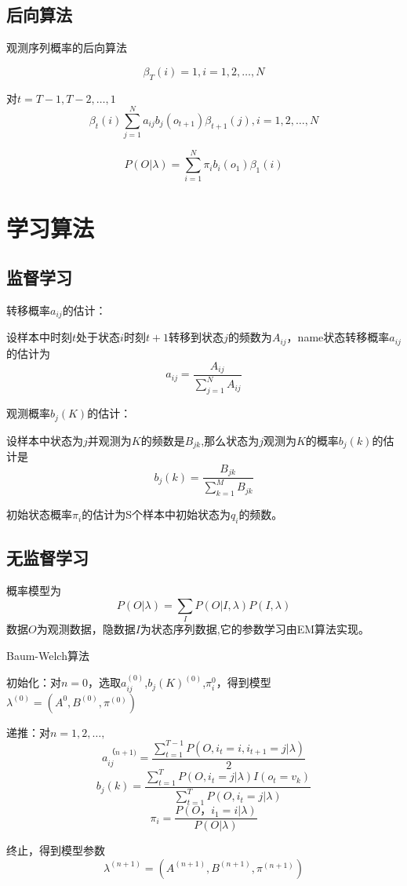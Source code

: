 \documentclass{article}
\begin{document}
	\subsection{后向算法}
	\begin{algorithm}[h]
		\caption{观测序列概率的后向算法}
		\LinesNumbered
		$$\beta _{T}\left ( i \right )=1,i=1,2,\ldots,N$$
		
		对$t=T-1,T-2,\ldots,1$
		$$\beta _{t}\left ( i \right )\sum_{j=1}^{N}a_{ij}b_{j}\left ( o_{t+1} \right )\beta _{t+1}\left ( j \right ),i=1,2,\ldots,N$$
		
		$$P\left ( O|\lambda  \right )=\sum_{i=1}^{N}\pi_{i}b_{i}\left ( o_{1} \right )\beta _{1}\left ( i \right )$$
	\end{algorithm}

	\section{学习算法}
	\subsection{监督学习}
	\noindent 转移概率$a_{ij}$的估计：
	
	设样本中时刻$t$处于状态$i$时刻$t+1$转移到状态$j$的频数为$A_{ij}$，name状态转移概率$a_{ij}$的估计为$$a_{ij}=\frac{A_{ij}}{\sum_{j=1}^{N}A_{ij}}$$
	
	\noindent 观测概率$b_{j}(K)的估计$：
	
	
	设样本中状态为$j$并观测为$K$的频数是$B_{jk}$,那么状态为$j$观测为$K$的概率$b_{j}(k)$的估计是
	$$b_{j}\left ( k \right )=\frac{B_{jk}}{\sum_{k=1}^{M}B_{jk}}$$
	
	初始状态概率$\pi_{i}$的估计为S个样本中初始状态为$q_{i}$的频数。
	
	\subsection{无监督学习}
	概率模型为$$P\left ( O|\lambda  \right )=\sum _{I}P\left ( O|I,\lambda  \right )P\left ( I,\lambda  \right )$$ 数据$O$为观测数据，隐数据$I$为状态序列数据,它的参数学习由EM算法实现。
	
	\begin{algorithm}[h]
		\caption{Baum-Welch算法}
		\LinesNumbered
		初始化：对$n=0$，选取$a_{ij}^{(0)}$,$b_{j}(K)^(0)$,$\pi_{i}^{0}$，得到模型$\lambda ^{(0)}=\left ( A^{0},B^{(0)},\pi^{(0)} \right )$
		
		递推：对$n=1,2,\ldots,$ $$a_{ij}^{（n+1)}=\frac{\sum_{t=1}^{T-1}P\left ( O,i_{t}=i,i_{t+1}=j|\lambda  \right )}{2}$$
		$$b_{j}\left ( k \right )=\frac{\sum_{t=1}^{T}P\left ( O,i_{t}=j|\lambda  \right )I\left ( o_{t}=v_{k} \right )}{\sum_{t=1}^{T}P\left ( O,i_{t}=j|\lambda  \right )}$$
		$$\pi_{i}=\frac{P\left ( O，i_{1}=i|\lambda  \right )}{P\left ( O|\lambda  \right )}$$
		
		终止，得到模型参数$$\lambda ^{\left ( n+1 \right )}=\left ( A^{(n+1)},B^{(n+1)},\pi^{\left ( n+1 \right )} \right )$$
		
	\end{algorithm}
\end{document}
